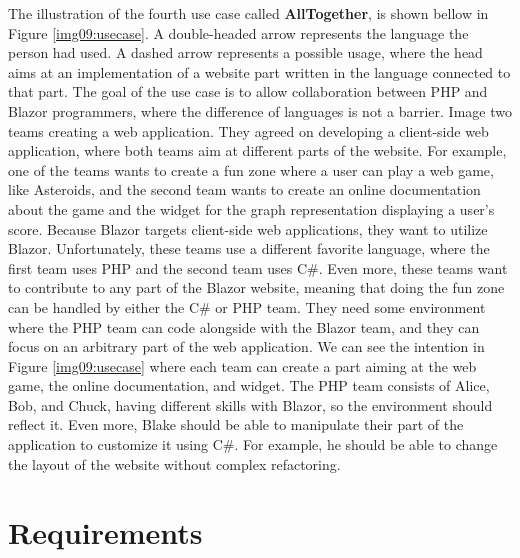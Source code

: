 \par
The illustration of the fourth use case called  \textbf{AllTogether}, is shown bellow in Figure \ref{img09:usecase}.
A double-headed arrow represents the language the person had used. 
A dashed arrow represents a possible usage, where the head aims at an implementation of a website part written in the language connected to that part.
The goal of the use case is to allow collaboration between PHP and Blazor programmers, where the difference of languages is not a barrier.  
Image two teams creating a web application. 
They agreed on developing a client-side web application, where both teams aim at different parts of the website.
For example, one of the teams wants to create a fun zone where a user can play a web game, like Asteroids, and the second team wants to create an online documentation about the game and the widget for the graph representation displaying a user's score.
Because Blazor targets client-side web applications, they want to utilize Blazor.
Unfortunately, these teams use a different favorite language, where the first team uses PHP and the second team uses C\#.
Even more, these teams want to contribute to any part of the Blazor website, meaning that doing the fun zone can be handled by either the C\# or PHP team.
They need some environment where the PHP team can code alongside with the Blazor team, and they can focus on an arbitrary part of the web application.
We can see the intention in Figure \ref{img09:usecase} where each team can create a part aiming at the web game, the online documentation, and widget.
The PHP team consists of Alice, Bob, and Chuck, having different skills with Blazor, so the environment should reflect it.
Even more, Blake should be able to manipulate their part of the application to customize it using C\#. For example, he should be able to change the layout of the website without complex refactoring. 

\section{Requirements}

